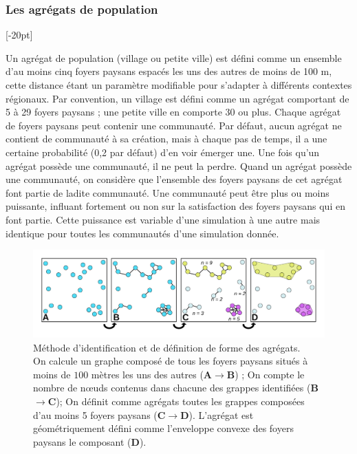 \subsubsection{Les agrégats de population}[-20pt]

Un agrégat de population (village ou petite ville) est défini comme un ensemble d'au moins cinq foyers paysans espacés les uns des autres de moins de 100 m, cette distance étant un paramètre modifiable pour s'adapter à différents contextes régionaux.
Par convention, un village est défini comme un agrégat comportant de 5 à 29 foyers paysans ; une petite ville en comporte 30 ou plus.
Chaque agrégat de foyers paysans peut contenir une communauté.
Par défaut, aucun agrégat ne contient de communauté à sa création, mais à chaque pas de temps, il a une certaine probabilité (0,2 par défaut) d'en voir émerger une.
Une fois qu'un agrégat possède une communauté, il ne peut la perdre.
Quand un agrégat possède une communauté, on considère que l'ensemble des foyers paysans de cet agrégat font partie de ladite communauté.
Une communauté peut être plus ou moins puissante, influant fortement ou non sur la satisfaction des foyers paysans qui en font partie.
Cette puissance est variable d'une simulation à une autre mais identique pour toutes les communautés d'une simulation donnée.

\begin{figure}[H]
	\centering
	\includegraphics[width=1\linewidth]{src/identification_agregats.pdf}
	\caption{Méthode d'identification et de définition de forme des agrégats.\\On calcule un graphe composé de tous les foyers paysans situés à moins de $100$ mètres les uns des autres (\textbf{A}$\rightarrow$\textbf{B}) ; On compte le nombre de nœuds contenus dans chacune des \og grappes\fg{} identifiées (\textbf{B}$\rightarrow$\textbf{C}); On définit comme agrégats toutes les grappes composées d'au moins 5 foyers paysans (\textbf{C}$\rightarrow$\textbf{D}). L'agrégat est géométriquement défini comme l'enveloppe convexe des foyers paysans le composant (\textbf{D}).}
\end{figure}

